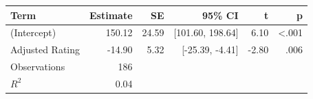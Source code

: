 \begin{tabular}{lrrrrr}
\toprule
Term & Estimate & SE & 95\% CI & t & p \\
\midrule
(Intercept) & 150.12 & 24.59 & [101.60, 198.64] & 6.10 & <.001 \\
Adjusted Rating & -14.90 & 5.32 & [-25.39, -4.41] & -2.80 & .006 \\
Observations & 186 &  &  &  &  \\
$R^2$ & 0.04 &  &  &  &  \\
\bottomrule
\end{tabular}
